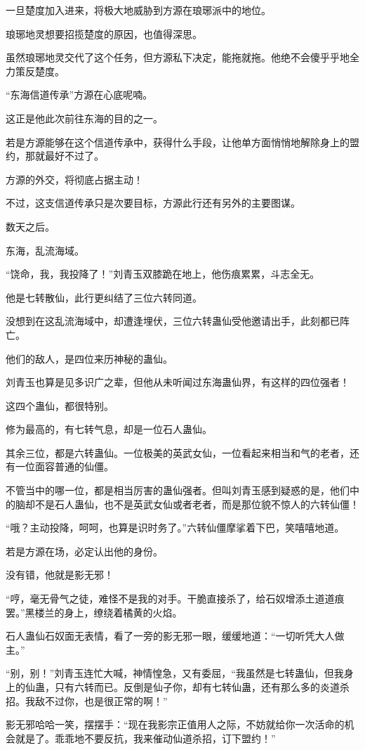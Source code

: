 \begin{this_body}
一旦楚度加入进来，将极大地威胁到方源在琅琊派中的地位。

琅琊地灵想要招揽楚度的原因，也值得深思。

虽然琅琊地灵交代了这个任务，但方源私下决定，能拖就拖。他绝不会傻乎乎地全力策反楚度。

“东海信道传承”方源在心底呢喃。

这正是他此次前往东海的目的之一。

若是方源能够在这个信道传承中，获得什么手段，让他单方面悄悄地解除身上的盟约，那就最好不过了。

方源的外交，将彻底占据主动！

不过，这支信道传承只是次要目标，方源此行还有另外的主要图谋。

数天之后。

东海，乱流海域。

“饶命，我，我投降了！”刘青玉双膝跪在地上，他伤痕累累，斗志全无。

他是七转散仙，此行更纠结了三位六转同道。

没想到在这乱流海域中，却遭逢埋伏，三位六转蛊仙受他邀请出手，此刻都已阵亡。

他们的敌人，是四位来历神秘的蛊仙。

刘青玉也算是见多识广之辈，但他从未听闻过东海蛊仙界，有这样的四位强者！

这四个蛊仙，都很特别。

修为最高的，有七转气息，却是一位石人蛊仙。

其余三位，都是六转蛊仙。一位极美的英武女仙，一位看起来相当和气的老者，还有一位面容普通的仙僵。

不管当中的哪一位，都是相当厉害的蛊仙强者。但叫刘青玉感到疑惑的是，他们中的脑却不是石人蛊仙，也不是英武女仙或者老者，而是那位貌不惊人的六转仙僵！

“哦？主动投降，呵呵，也算是识时务了。”六转仙僵摩挲着下巴，笑嘻嘻地道。

若是方源在场，必定认出他的身份。

没有错，他就是影无邪！

“哼，毫无骨气之徒，难怪不是我的对手。干脆直接杀了，给石奴增添土道道痕罢。”黑楼兰的身上，缭绕着橘黄的火焰。

石人蛊仙石奴面无表情，看了一旁的影无邪一眼，缓缓地道：“一切听凭大人做主。”

“别，别！”刘青玉连忙大喊，神情惶急，又有委屈，“我虽然是七转蛊仙，但我身上的仙蛊，只有六转而已。反倒是仙子你，却有七转仙蛊，还有那么多的炎道杀招。我敌不过你，也是很正常的啊！”

影无邪哈哈一笑，摆摆手：“现在我影宗正值用人之际，不妨就给你一次活命的机会就是了。乖乖地不要反抗，我来催动仙道杀招，订下盟约！”


\end{this_body}
